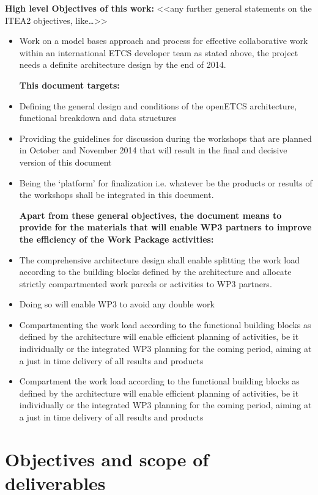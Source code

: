 \textbf{High level Objectives of this work:}
<<any further general statements on the ITEA2  objectives, like…>>\\

\begin{itemize}
\item Work on a model bases approach and process for effective collaborative work within an international ETCS developer team as stated above, the project needs a definite architecture design by the end of 2014.

\textbf{This document targets:}
\item Defining the general design and conditions of the openETCS architecture, functional breakdown and data structures
\item Providing the guidelines for discussion during the workshops that are planned in October and November 2014 that will result in the final and decisive version of this document
\item Being the ‘platform’ for finalization i.e. whatever be the products or results of the workshops shall be integrated in this document.

\textbf{Apart from these general objectives, the document means to provide for the materials that will enable WP3 partners to improve the efficiency of the Work Package activities:}
\item The comprehensive architecture design shall enable splitting the work load according to the building blocks defined by the architecture and allocate strictly compartmented work parcels or activities to WP3 partners.
\item Doing so will enable WP3 to avoid any double work
\item  Compartmenting the work load according to the functional building blocks as defined by the architecture will enable efficient planning of activities, be it individually or the integrated WP3 planning for the coming period, aiming at a just in time delivery of all results and products
\item  Compartment the work load according to the functional building blocks as defined by the architecture will enable efficient planning of activities, be it individually or the integrated WP3 planning for the coming period, aiming at a just in time delivery of all results and products
\end{itemize}



\section{Objectives and scope of deliverables}

